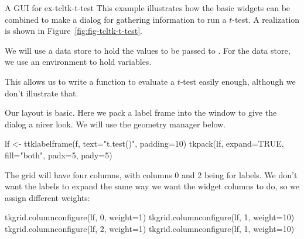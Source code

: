 \begin{example}{A GUI for }{ex-tcltk-t-test}
This example illustrates how the basic widgets can be combined to make
a dialog for gathering information to run a $t$-test. A realization is shown in Figure~\ref{fig:fig-tcltk-t-test}.






We will use a data store to hold the values to be passed to
. For the data store, we  use an environment to hold \Tcl\/ variables.

\begin{Schunk}
\end{Schunk}

This allows us to write a function to evaluate a $t$-test easily
enough, although we don't illustrate that.






Our layout is basic. Here we pack a label frame into the window to give the dialog a nicer look.
We will use the  geometry manager below.
\begin{Schunk}
\begin{Sinput}
 lf <- ttklabelframe(f, text="t.test()", padding=10)
 tkpack(lf, expand=TRUE, fill="both", padx=5, pady=5)
\end{Sinput}
\end{Schunk}

The grid will have four columns, with columns 0 and 2 being for labels.
We don't want the labels to expand the same way we want the widget columns to do, so we
assign different weights:
\begin{Schunk}
\begin{Sinput}
 tkgrid.columnconfigure(lf, 0, weight=1)
 tkgrid.columnconfigure(lf, 1, weight=10)
 tkgrid.columnconfigure(lf, 2, weight=1)
 tkgrid.columnconfigure(lf, 1, weight=10)
\end{Sinput}
\end{Schunk}



\end{example}

